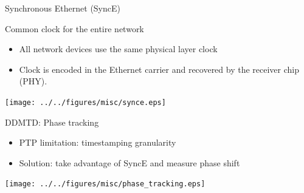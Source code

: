 \documentclass[compress,red]{beamer}
\begin{document}
\begin{frame}{Synchronous Ethernet (SyncE)}

 \begin{block}{Common clock for the entire network}
    \begin{itemize}
	 \item All network devices use the same physical layer clock
	 \item Clock is encoded in the Ethernet carrier and recovered by the receiver chip (PHY).
    \end{itemize}
\end{block}

\vspace{-0.2cm}

\begin{center}
\texttt{[image: ../../figures/misc/synce.eps]}
\end{center}

\end{frame}
\begin{frame}{DDMTD: Phase tracking}

\small
    \begin{itemize}
      \item PTP limitation: timestamping granularity
      \item Solution: take advantage of SyncE and measure phase shift
    \end{itemize}

  \begin{center}
  \texttt{[image: ../../figures/misc/phase\_tracking.eps]}
  \end{center}

\end{frame}
\end{document}
